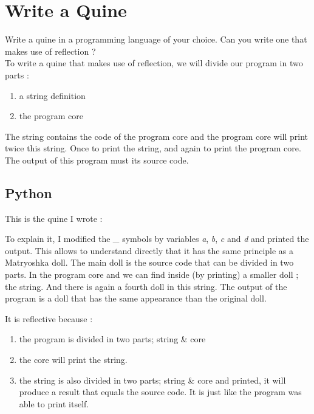 \section{Write a Quine}
Write a quine in a programming language of your choice.
Can you write one that makes use of reflection ?\\

To write a quine that makes use of reflection, we will divide our program in two parts :
\begin{enumerate}
    \item a string definition
    \item the program core
\end{enumerate}
The string contains the code of the program core and the program core will print twice this string. Once to print the string, and again to print the program core. The output of this program must its source code.


\subsection{Python}
This is the quine I wrote :


To explain it, I modified the \emph{\_} symbols by variables \emph{a}, \emph{b}, \emph{c} and \emph{d} and printed the output. This allows to understand directly that it has the same principle as a Matryoshka doll. The main doll is the source code that can be divided in two parts. In the program core and we can find inside (by printing) a smaller doll ; the string. And there is again a fourth doll in this string. The output of the program is a doll that has the same appearance than the original doll.


It is reflective because :
\begin{enumerate}
    \item the program is divided in two parts; string \& core
    \item the core will print the string.
    \item the string is also divided in two parts; string \& core and printed, it will produce a result that equals the source code. It is just like the program was able to print itself. 
\end{enumerate}
